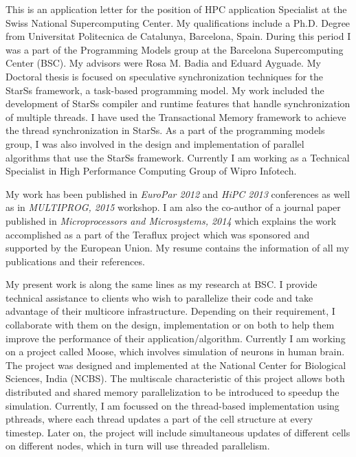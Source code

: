 \documentclass[10pt,stdletter,dateno]{newlfm}
\begin{document}
\begin{newlfm}
	   This is an application letter for the position of HPC application Specialist at the Swiss National Supercomputing Center. 
	   My qualifications include a Ph.D. Degree from Universitat Politecnica de Catalunya, Barcelona, Spain. 
	   During this period I was a part of the Programming Models group at the Barcelona Supercomputing Center (BSC). 
	   My advisors were Rosa M. Badia and Eduard Ayguade. 
	   My Doctoral thesis is focused on speculative synchronization techniques for the StarSs framework, a task-based programming model.
	   My work included the development of StarSs compiler and runtime features that handle synchronization of multiple threads.
	   I have used the Transactional Memory framework to achieve the thread synchronization in StarSs.
	   As a part of the programming models group, I was also involved in the design and implementation of parallel algorithms that use the StarSs framework.
	   Currently I am working as a Technical Specialist in High Performance Computing Group of Wipro Infotech. 
%
\par
	   My work has been published in \textit{EuroPar 2012} and \textit{HiPC 2013} conferences as well as in \textit{MULTIPROG, 2015} workshop.  
	   I am also the co-author of a journal paper published in \textit{Microprocessors and Microsystems, 2014} which explains the work accomplished as a part of the Teraflux project which was sponsored and supported by the European Union. 
	   My resume contains the information of all my publications and their references. 
%
\par
	   My present work is along the same lines as my research at BSC. 
	   I provide technical assistance to clients who wish to parallelize their code and take advantage of their multicore infrastructure. 
	   Depending on their requirement, I collaborate with them on the design, implementation or on both to help them improve the performance of their application/algorithm.
	   Currently I am working on a project called Moose, which involves simulation of neurons in human brain. 
	   The project was designed and implemented at the National Center for Biological Sciences, India (NCBS). 
	   The multiscale characteristic of this project allows both distributed and shared memory parallelization to be introduced to speedup the simulation. 
	   Currently, I am focussed on the thread-based implementation using pthreads, where each thread updates a part of the cell structure at every timestep. 
	   Later on, the project will include simultaneous updates of different cells on different nodes, which in turn will use threaded parallelism. 

\end{newlfm}
\end{document}
